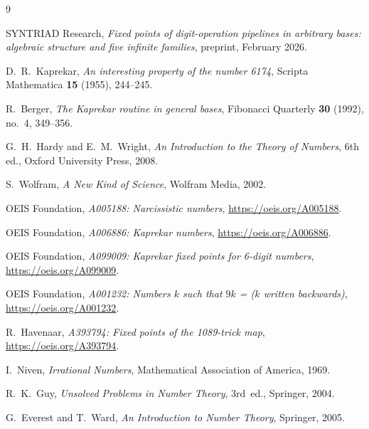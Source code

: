 \documentclass[11pt,a4paper]{amsart}
\theoremstyle{plain}
\theoremstyle{definition}
\theoremstyle{remark}
\begin{document}
\begin{thebibliography}{9}

SYNTRIAD Research,
\emph{Fixed points of digit-operation pipelines in arbitrary bases:
algebraic structure and five infinite families},
preprint, February 2026.

D.~R.~Kaprekar,
\emph{An interesting property of the number 6174},
Scripta Mathematica \textbf{15} (1955), 244--245.

R.~Berger,
\emph{The Kaprekar routine in general bases},
Fibonacci Quarterly \textbf{30} (1992), no.~4, 349--356.

G.~H.~Hardy and E.~M.~Wright,
\emph{An Introduction to the Theory of Numbers},
6th ed., Oxford University Press, 2008.

S.~Wolfram,
\emph{A New Kind of Science},
Wolfram Media, 2002.

OEIS Foundation,
\emph{A005188: Narcissistic numbers},
\url{https://oeis.org/A005188}.

OEIS Foundation,
\emph{A006886: Kaprekar numbers},
\url{https://oeis.org/A006886}.

OEIS Foundation,
\emph{A099009: Kaprekar fixed points for 6-digit numbers},
\url{https://oeis.org/A099009}.

OEIS Foundation,
\emph{A001232: Numbers $k$ such that $9k$ = ($k$ written backwards)},
\url{https://oeis.org/A001232}.

R.~Havenaar,
\emph{A393794: Fixed points of the 1089-trick map},
\url{https://oeis.org/A393794}.

I.~Niven,
\emph{Irrational Numbers},
Mathematical Association of America, 1969.

R.~K.~Guy,
\emph{Unsolved Problems in Number Theory},
3rd~ed., Springer, 2004.

G.~Everest and T.~Ward,
\emph{An Introduction to Number Theory},
Springer, 2005.

\end{thebibliography}
\end{document}
